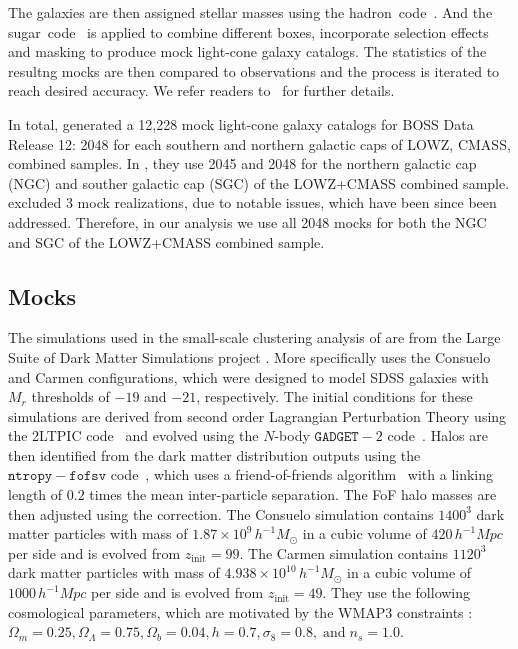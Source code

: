 \documentclass[12pt, letterpaper, preprint]{aastex}
\begin{document}
The galaxies are then assigned stellar masses using the 
{\fontshape\scdefault\selectfont hadron}~code~\citep{zhao2015}.
And the {\fontshape\scdefault\selectfont sugar}~code~\citep{rodriguez-torres2016} 
is applied to combine different boxes, incorporate selection
effects and masking to produce mock light-cone galaxy catalogs. 
The statistics of the resultng mocks are then compared to 
observations and the process is iterated to reach desired 
accuracy. We refer readers to~\cite{kitaura2016} for further 
details. 

In total, \cite{kitaura2016} generated a 12,228 mock light-cone 
galaxy catalogs for BOSS Data Release 12: 2048 for each southern 
and northern galactic caps of LOWZ, CMASS, combined samples. 
In \cite{beutler2017}, they use 2045 and 2048 for the northern 
galactic cap (NGC) and souther galactic cap (SGC) of the LOWZ+CMASS
combined sample. \cite{beutler2017} excluded 3 mock realizations, 
due to notable issues, which have been since been addressed. Therefore, 
in our analysis we use all 2048 mocks for both the NGC and SGC of 
the LOWZ+CMASS combined sample.

\subsection{\cite{sinha2017a} Mocks} \label{sec:gmf} 
The simulations used in the small-scale clustering analysis of \cite{sinha2017a} 
are from the Large Suite of Dark Matter Simulations project 
\citep[LasDamas;][]{mcbride2009}. More specifically \cite{sinha2017a} uses
the Consuelo and Carmen configurations, which were designed to model SDSS 
galaxies with $M_r$ thresholds of $-19$ and $-21$, respectively.
The initial conditions for these simulations are derived from second order 
Lagrangian Perturbation Theory using the 2LTPIC code~\citep{scoccimarro1998, crocce2006}
and evolved using the $N$-body $\mathtt{GADGET}-2$ code~\citep{springel2005}.
Halos are then identified from the dark matter distribution outputs using 
the $\mathtt{ntropy-fofsv}$ code~\citep{gardner2007}, which uses a 
friend-of-friends algorithm~\citep[FoF;][]{davis1985} with a linking length of $0.2$
times the mean inter-particle separation. The FoF halo masses are then adjusted 
using the \cite{warren2006} correction. 
The Consuelo simulation contains $1400^3$ dark matter particles with 
mass of $1.87 \times 10^9\,h^{-1} M_\odot$ in a cubic volume of 
$420\,h^{-1} Mpc$ per side and is evolved from $z_\mathrm{init} = 99$. 
The Carmen simulation contains $1120^3$ dark matter particles with mass 
of $4.938 \times 10^{10}\,h^{-1} M_\odot$ in a cubic volume of 
$1000\,h^{-1} Mpc$ per side and is evolved from $z_\mathrm{init} = 49$. 
They use the following cosmological parameters, which are motivated 
by the WMAP3 constraints \citep{spergel2007}:
$\Omega_m = 0.25, \Omega_\Lambda = 0.75, \Omega_b = 0.04, h = 0.7, \sigma_8 = 0.8,\;\mathrm{and}\;n_s = 1.0.$
\end{document}
